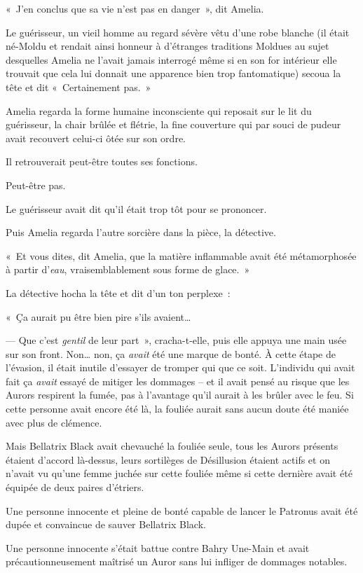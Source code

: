 «~J'en conclus que sa vie n'est pas en danger~», dit Amelia.

Le guérisseur, un vieil homme au regard sévère vêtu d'une robe blanche (il était né-Moldu et rendait ainsi honneur à d'étranges traditions Moldues au sujet desquelles Amelia ne l'avait jamais interrogé même si en son for intérieur elle trouvait que cela lui donnait une apparence bien trop fantomatique) secoua la tête et dit «~Certainement pas.~»

Amelia regarda la forme humaine inconsciente qui reposait sur le lit du guérisseur, la chair brûlée et flétrie, la fine couverture qui par souci de pudeur avait recouvert celui-ci ôtée sur son ordre.

Il retrouverait peut-être toutes ses fonctions.

Peut-être pas.

Le guérisseur avait dit qu'il était trop tôt pour se prononcer.

Puis Amelia regarda l'autre sorcière dans la pièce, la détective.

«~Et vous dites, dit Amelia, que la matière inflammable avait été métamorphosée à partir d'\emph{eau}, vraisemblablement sous forme de glace.~»

La détective hocha la tête et dit d'un ton perplexe~:

«~Ça aurait pu être bien pire s'ils avaient…

--- Que c'est \emph{gentil} de leur part~», cracha-t-elle, puis elle appuya une main usée sur son front.
Non… non, ça \emph{avait} été une marque de bonté.
À cette étape de l'évasion, il était inutile d'essayer de tromper qui que ce soit.
L'individu qui avait fait ça \emph{avait} essayé de mitiger les dommages -- et il avait pensé au risque que les Aurors respirent la fumée, pas à l'avantage qu'il aurait à les brûler avec le feu.
Si cette personne avait encore été là, la fouliée aurait sans aucun doute été maniée avec plus de clémence.

Mais Bellatrix Black avait chevauché la fouliée seule, tous les Aurors présents étaient d'accord là-dessus, leurs sortilèges de Désillusion étaient actifs et on n'avait vu qu'une femme juchée sur cette fouliée même si cette dernière avait été équipée de deux paires d'étriers.

Une personne innocente et pleine de bonté capable de lancer le Patronus avait été dupée et convaincue de sauver Bellatrix Black.

Une personne innocente s'était battue contre Bahry Une-Main et avait précautionneusement maîtrisé un Auror sans lui infliger de dommages notables.

